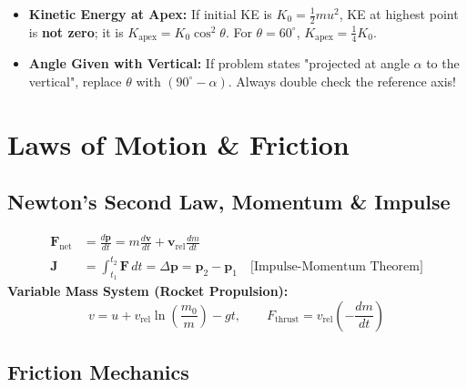 \documentclass[11pt,a4paper]{article}
\begin{document}
\begin{trapbox}
\begin{itemize}
  \item \textbf{Kinetic Energy at Apex:} If initial KE is $K_0 = \frac{1}{2}mu^2$, KE at highest point is \textbf{not zero}; it is $K_{\text{apex}} = K_0 \cos^2\theta$. For $\theta=60^\circ$, $K_{\text{apex}} = \frac{1}{4}K_0$.
  \item \textbf{Angle Given with Vertical:} If problem states "projected at angle $\alpha$ to the vertical", replace $\theta$ with $(90^\circ - \alpha)$. Always double check the reference axis!
\end{itemize}
\end{trapbox}

\newpage

\section{Laws of Motion \& Friction}

\subsection{Newton's Second Law, Momentum \& Impulse}

\begin{formulabox}
\begin{align}
  \mathbf{F}_{\text{net}} &= \frac{d\mathbf{p}}{dt} = m\frac{d\mathbf{v}}{dt} + \mathbf{v}_{\text{rel}}\frac{dm}{dt} \\
  \mathbf{J} &= \int_{t_1}^{t_2} \mathbf{F}\,dt = \Delta\mathbf{p} = \mathbf{p}_2 - \mathbf{p}_1 \quad \text{[Impulse-Momentum Theorem]}
\end{align}
\textbf{Variable Mass System (Rocket Propulsion):}
\begin{equation}
  v = u + v_{\text{rel}}\ln\left(\frac{m_0}{m}\right) - gt, \qquad F_{\text{thrust}} = v_{\text{rel}}\left(-\frac{dm}{dt}\right)
\end{equation}
\end{formulabox}

\subsection{Friction Mechanics}
\end{document}
